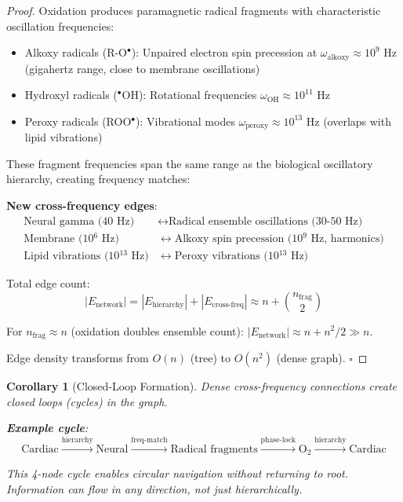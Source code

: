 \documentclass[11pt,a4paper]{article}
\newtheorem{corollary}[theorem]{Corollary}
\theoremstyle{definition}
\theoremstyle{remark}
\begin{document}
\begin{proof}
Oxidation produces paramagnetic radical fragments with characteristic oscillation frequencies:
\begin{itemize}
\item Alkoxy radicals (R-O$^\bullet$): Unpaired electron spin precession at $\omega_{\text{alkoxy}} \approx 10^9$ Hz (gigahertz range, close to membrane oscillations)
\item Hydroxyl radicals ($^\bullet$OH): Rotational frequencies $\omega_{\text{OH}} \approx 10^{11}$ Hz
\item Peroxy radicals (ROO$^\bullet$): Vibrational modes $\omega_{\text{peroxy}} \approx 10^{13}$ Hz (overlaps with lipid vibrations)
\end{itemize}

These fragment frequencies span the same range as the biological oscillatory hierarchy, creating frequency matches:

\textbf{New cross-frequency edges}:
\begin{align}
\text{Neural gamma (40 Hz)} &\leftrightarrow \text{Radical ensemble oscillations (30-50 Hz)} \\
\text{Membrane (10$^{6}$ Hz)} &\leftrightarrow \text{Alkoxy spin precession (10$^{9}$ Hz, harmonics)} \\
\text{Lipid vibrations (10$^{13}$ Hz)} &\leftrightarrow \text{Peroxy vibrations (10$^{13}$ Hz)}
\end{align}

Total edge count:
\begin{equation}
|E_{\text{network}}| = |E_{\text{hierarchy}}| + |E_{\text{cross-freq}}| \approx n + \binom{n_{\text{frag}}}{2}
\end{equation}

For $n_{\text{frag}} \approx n$ (oxidation doubles ensemble count): $|E_{\text{network}}| \approx n + n^2/2 \gg n$.

Edge density transforms from $O(n)$ (tree) to $O(n^2)$ (dense graph). $\square$
\end{proof}

\begin{corollary}[Closed-Loop Formation]
Dense cross-frequency connections create closed loops (cycles) in the graph.

\textbf{Example cycle}:
\begin{equation}
\text{Cardiac} \xrightarrow{\text{hierarchy}} \text{Neural} \xrightarrow{\text{freq-match}} \text{Radical fragments} \xrightarrow{\text{phase-lock}} \text{O}_2 \xrightarrow{\text{hierarchy}} \text{Cardiac}
\end{equation}

This 4-node cycle enables circular navigation without returning to root. Information can flow in any direction, not just hierarchically.
\end{corollary}
\end{document}
